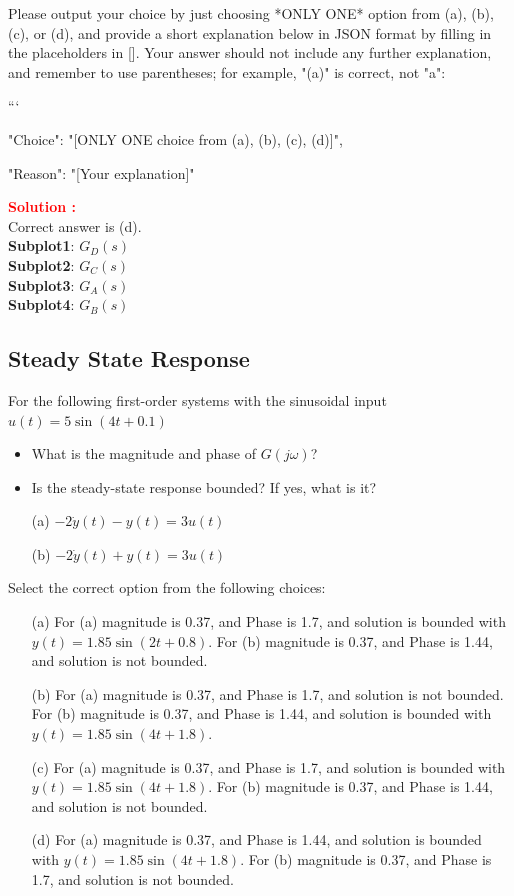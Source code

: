 \documentclass[12pt]{article}
\begin{document}
Please output your choice by just choosing *ONLY ONE* option from (a), (b), (c), or (d), and provide a short explanation below in JSON format by filling in the placeholders in []. Your answer should not include any further explanation, and remember to use parentheses; for example, "(a)" is correct, not "a": 

```
{

"Choice": "[ONLY ONE choice from (a), (b), (c), (d)]",

"Reason": "[Your explanation]"

}


\textbf{\textcolor{red}{Solution :}} \\
Correct answer is (d).\\
\textbf{Subplot1}: \(G_D(s)\) \\
\textbf{Subplot2}: \(G_C(s)\) \\
\textbf{Subplot3}: \(G_A(s)\) \\
\textbf{Subplot4}: \(G_B(s)\) \\
\clearpage

\subsection{Steady State Response}

For the following first-order systems with the sinusoidal input \(u(t) = 5 \sin(4t+0.1)\)
\begin{itemize}
    \item What is the magnitude and phase of \(G(j\omega)\)?
    \item Is the steady-state response bounded? If yes, what is it?
    \item[(a)] \(-2\dot{y}(t) - y(t) = 3 u(t)\)
        \item[(b)] \(-2\dot{y}(t) + y(t) = 3 u(t)\)
\end{itemize}
Select the correct option from the following choices:
\begin{enumerate}
    \item [(a)] For (a) magnitude is 0.37, and Phase is 1.7, and solution is bounded with \(y(t) = 1.85 \sin(2t+0.8)\). For (b) magnitude is 0.37, and Phase is 1.44, and solution is not bounded. 
    \item [(b)] For (a) magnitude is 0.37, and Phase is 1.7, and solution is not bounded. For (b) magnitude is 0.37, and Phase is 1.44, and solution is bounded with \(y(t) = 1.85 \sin(4t+1.8)\).   
    \item [(c)] For (a) magnitude is 0.37, and Phase is 1.7, and solution is bounded with \(y(t) = 1.85 \sin(4t+1.8)\). For (b) magnitude is 0.37, and Phase is 1.44, and solution is not bounded.    
    \item [(d)] For (a) magnitude is 0.37, and Phase is 1.44, and solution is bounded with \(y(t) = 1.85 \sin(4t+1.8)\). For (b) magnitude is 0.37, and Phase is 1.7, and solution is not bounded.   
\end{enumerate}
\end{document}
